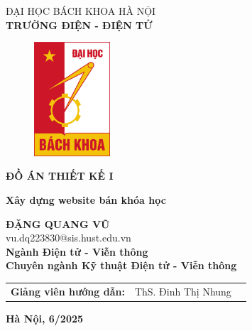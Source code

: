 \documentclass{article}
\begin{document}
	\cleardoublepage
	\thispagestyle{empty}
	\begin{center}
		\vspace{-12pt}  \fontsize{14pt}{0pt}\selectfont ĐẠI HỌC BÁCH KHOA HÀ NỘI \\[6pt]
		\textbf{\fontsize{16pt}{0pt}\selectfont TRƯỜNG ĐIỆN - ĐIỆN TỬ}
		\vspace{1.75cm}
		\begin{figure}[H]
			\centering
			\includegraphics[height=4.25cm]{logoHUST.png}
		\end{figure}
		\vspace{1cm}
		\textbf{\fontsize{25pt}{0pt}\selectfont ĐỒ ÁN THIẾT KẾ I} 
		\vspace{0.5cm}
	\end{center}
	\begin{center}
		\textbf{\fontsize{22pt}{0pt}\selectfont Xây dựng website bán khóa học} \\
		\vspace{2.5cm}
		
		\textbf{\fontsize{18pt}{0pt}\selectfont ĐẶNG QUANG VŨ} \\[6pt]
		\fontsize{16pt}{0pt}\selectfont vu.dq223830@sis.hust.edu.vn \\[6pt]
		\vspace{0.75cm}
		\textbf{\fontsize{16pt}{0pt}\selectfont Ngành Điện tử - Viễn thông} \\[6pt]
		\textbf{\fontsize{16pt}{0pt}\selectfont Chuyên ngành Kỹ thuật Điện tử - Viễn thông} 
		\vspace{0.75cm}
		\begin{table}[H]
			\centering
			\begin{tabular}{l l l}
				\fontsize{16pt}{0pt}\selectfont \textbf{Giảng viên hướng dẫn:}    & \fontsize{16pt}{0pt}\selectfont ThS. Đinh Thị Nhung \vspace{6pt} &  \\ 
			\end{tabular}
		\end{table}
		\vspace{2.5cm}
		\fontsize{14pt}{0pt}\selectfont \textbf{Hà Nội, 6/2025}
	\end{center}
	\cleardoublepage
\end{document}
